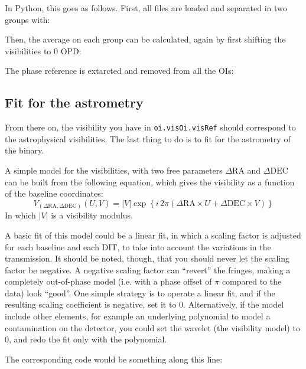 \noindent{}In Python, this goes as follows. First, all files are loaded and separated in two groups with:


\noindent{}Then, the average on each group can be calculated, again by first shifting the visibilities to 0 OPD:


\noindent{}The phase reference is extarcted and removed from all the OIs:




\subsection{Fit for the astrometry}

From there on, the visibility you have in \verb|oi.visOi.visRef| should correspond to the astrophysical visibilities. The last thing to do is to fit for the astrometry of the binary.

A simple model for the visibilities, with two free parameters $\Delta\mathrm{RA}$ and $\Delta\mathrm{DEC}$ can be built from the following equation, which gives the visibility as a function of the baseline coordinates:
\begin{equation*}
  V_{(\Delta{}\mathrm{RA}, \Delta{}\mathrm{DEC})}(U, V) = |V|\exp\left\{{i\,2\pi}\left(\Delta\mathrm{RA}\times{}U+\Delta\mathrm{DEC}\times{}V\right)\right\}
\end{equation*}
\noindent{}In which $|V|$ is a visibility modulus.

A basic fit of this model could be a linear fit, in which a scaling factor is adjusted for each baseline and each DIT, to take into account the variations in the transmission. It should be noted, though, that you should never let the scaling factor be negative. A negative scaling factor can ``revert'' the fringes, making a completely out-of-phase model (i.e. with a phase offset of $\pi$ compared to the data) look ``good''. One simple strategy is to operate a linear fit, and if the resulting scaling coefficient is negative, set it to 0. Alternatively, if the model include other elements, for example an underlying polynomial to model a contamination on the detector, you could set the wavelet (the visibility model) to 0, and redo the fit only with the polynomial.

The corresponding code would be something along this line:


